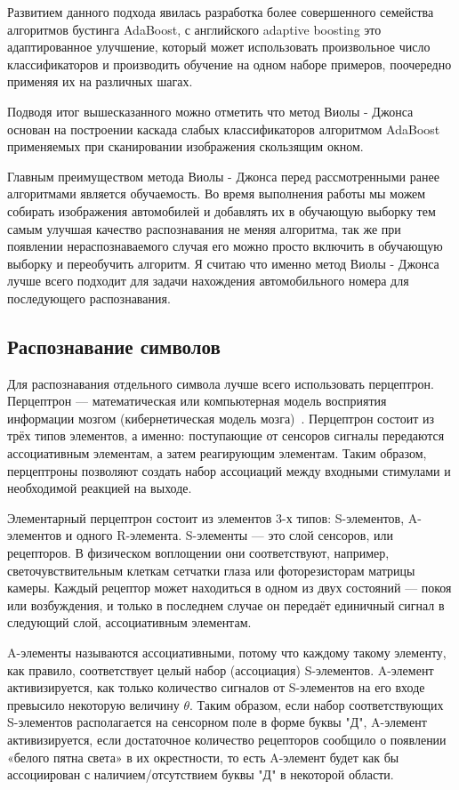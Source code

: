 Развитием данного подхода явилась разработка более совершенного семейства алгоритмов бустинга AdaBoost, с английского adaptive boosting это адаптированное улучшение, который может использовать произвольное число классификаторов и производить обучение на одном наборе примеров, поочередно применяя их на различных шагах.

Подводя итог вышесказанного можно отметить что метод Виолы - Джонса основан на построении каскада слабых классификаторов алгоритмом AdaBoost применяемых при сканировании изображения скользящим окном.

Главным преимуществом метода Виолы - Джонса перед рассмотренными ранее алгоритмами является обучаемость. Во время выполнения работы мы можем собирать изображения автомобилей и добавлять их в обучающую выборку тем самым улучшая качество распознавания не меняя алгоритма, так же при появлении нераспознаваемого случая его можно просто включить в обучающую выборку и переобучить алгоритм. Я считаю что именно метод Виолы - Джонса лучше всего подходит для задачи нахождения автомобильного номера для последующего распознавания.

\subsection{Распознавание символов}
\label{sub:domain:imagerecognition}
Для распознавания отдельного символа лучше всего использовать перцептрон.
Перцептрон — математическая или компьютерная модель восприятия информации мозгом (кибернетическая модель мозга)~\cite{perceptron}.
Перцептрон состоит из трёх типов элементов, а именно: поступающие от сенсоров сигналы передаются ассоциативным элементам, а затем реагирующим элементам. Таким образом, перцептроны позволяют создать набор ассоциаций между входными стимулами и необходимой реакцией на выходе.

Элементарный перцептрон состоит из элементов 3-х типов: S-элементов, A-элементов и одного R-элемента. S-элементы — это слой сенсоров, или рецепторов. В физическом воплощении они соответствуют, например, светочувствительным клеткам сетчатки глаза или фоторезисторам матрицы камеры. Каждый рецептор может находиться в одном из двух состояний — покоя или возбуждения, и только в последнем случае он передаёт единичный сигнал в следующий слой, ассоциативным элементам.

A-элементы называются ассоциативными, потому что каждому такому элементу, как правило, соответствует целый набор (ассоциация) S-элементов. A-элемент активизируется, как только количество сигналов от S-элементов на его входе превысило некоторую величину $\theta$. Таким образом, если набор соответствующих S-элементов располагается на сенсорном поле в форме буквы "Д", A-элемент активизируется, если достаточное количество рецепторов сообщило о появлении «белого пятна света» в их окрестности, то есть A-элемент будет как бы ассоциирован с наличием/отсутствием буквы "Д" в некоторой области.


